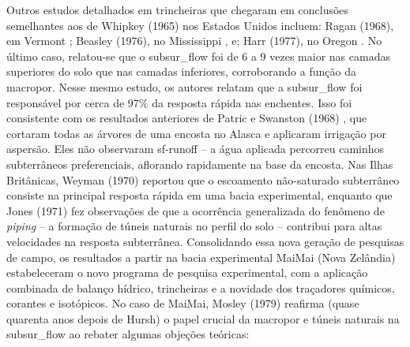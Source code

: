 \documentclass[./main.tex]{subfiles}
\begin{document}
\par Outros estudos detalhados em trincheiras que chegaram em conclusões semelhantes aos de Whipkey (1965) nos Estados Unidos incluem: Ragan (1968), em Vermont \cite{Ragan1968}; Beasley (1976), no Mississippi \cite{Beasley1976}, e; Harr (1977), no Oregon \cite{Harr1977}. No último caso, relatou-se que o \gls{subsur_flow} foi de 6 a 9 vezes maior nas camadas superiores do solo que nas camadas inferiores, corroborando a função da \gls{macropor}. Nesse mesmo estudo, os autores relatam que a \gls{subsur_flow} foi responsável por cerca de 97\% da resposta rápida nas enchentes. Isso foi consistente com os resultados anteriores de Patric e Swanston (1968) \cite{patric1968}, que cortaram todas as árvores de uma encosta no Alasca e aplicaram irrigação por aspersão. Eles não observaram \gls{sf-runoff} -- a água aplicada percorreu caminhos subterrâneos preferenciais, aflorando rapidamente na base da encosta. Nas Ilhas Britânicas, Weyman (1970) \cite{weyman1970} reportou que o escoamento não-saturado subterrâneo consiste na principal resposta rápida em uma bacia experimental, enquanto que Jones (1971) \cite{Jones1971} fez observações de que a ocorrência generalizada do fenômeno de \textit{piping} -- a formação de túneis naturais no perfil do solo -- contribui para altas velocidades na resposta subterrânea. Consolidando essa nova geração de pesquisas de campo, os resultados a partir na bacia experimental MaiMai (Nova Zelândia) estabeleceram o novo programa de pesquisa experimental, com a aplicação combinada de balanço hídrico, trincheiras e a novidade dos traçadores químicos, corantes e isotópicos. No caso de MaiMai, Mosley (1979) \cite{Mosley1979} reafirma (quase quarenta anos depois de Hursh) o papel crucial da \gls{macropor} e túneis naturais na \gls{subsur_flow} ao rebater algumas objeções teóricas:
\end{document}
